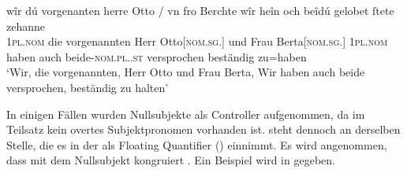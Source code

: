 \begin{exe}
\ex \label{ex:cao_diffgend_11_beide}
		\gll wîr dú vorgenanten herre Otto / vn fro Berchte
				\textelp{} wîr heîn och beîdú \textelp{}
				gelobet ſtete zehanne \\
			\textsc{1pl\subMF.nom} die vorgenannten Herr
				Otto[\textsc{nom.sg.\MascM}] {} und Frau
				Berta[\textsc{nom.sg.\FemF}] {} \textsc{1pl\subMF.nom} haben
				auch beide-\textsc{nom.pl.\NeutMF.st} {} versprochen beständig
				zu=haben \\
		\trans `Wir, die vorgenannten, Herr Otto und Frau Berta,
		\textelp{} Wir haben auch beide \textelp{} versprochen, beständig zu
			halten'
			\parencites(Nr.~2931, Basel, 1298)[223,1--6]{cao4}

\end{exe}

\label{phsec:vbctrl}
In einigen Fällen wurden Nullsubjekte als Controller aufgenommen, da im
Teilsatz kein overtes Subjektpronomen vorhanden ist.  steht dennoch
an derselben Stelle, die es in der  als Floating
Quantifier () einnimmt. Es wird
angenommen, dass  mit dem Nullsubjekt kongruiert \autocites[siehe
auch][419]{dalrymple2001}[210]{bresnanetal2016}. Ein Beispiel wird in
 gegeben.

